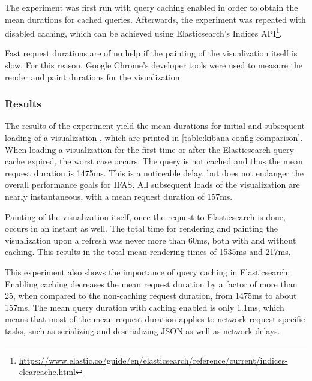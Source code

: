 The experiment was first run with query caching enabled in order to obtain the mean durations for cached queries.
Afterwards, the experiment was repeated with disabled caching, which can be achieved using Elasticsearch's Indices API\footnote{\url{https://www.elastic.co/guide/en/elasticsearch/reference/current/indices-clearcache.html}}.

Fast request durations are of no help if the painting of the visualization itself is slow.
For this reason, Google Chrome's developer tools were used to measure the render and paint durations for the visualization.

\subsubsection{Results}

The results of the experiment yield the mean durations for initial and subsequent loading of a visualization , which are printed in \cref{table:kibana-config-comparison}.
When loading a visualization for the first time or after the Elasticsearch query cache expired, the worst case occurs: The query is not cached and thus the mean request duration is 1475ms.
This is a noticeable delay, but does not endanger the overall performance goals for \ac{IFAS}.
All subsequent loads of the visualization are nearly instantaneous, with a mean request duration of 157ms.

Painting of the visualization itself, once the request to Elasticsearch is done, occurs in an instant as well.
The total time for rendering and painting the visualization upon a refresh was never more than 60ms, both with and without caching.
This results in the total mean rendering times of 1535ms and 217ms.

This experiment also shows the importance of query caching in Elasticsearch:
Enabling caching decreases the mean request duration by a factor of more than 25, when compared to the non-caching request duration, from 1475ms to about 157ms.
The mean query duration with caching enabled is only 1.1ms, which means that most of the mean request duration applies to network request specific tasks, such as serializing and deserializing JSON as well as network delays.

